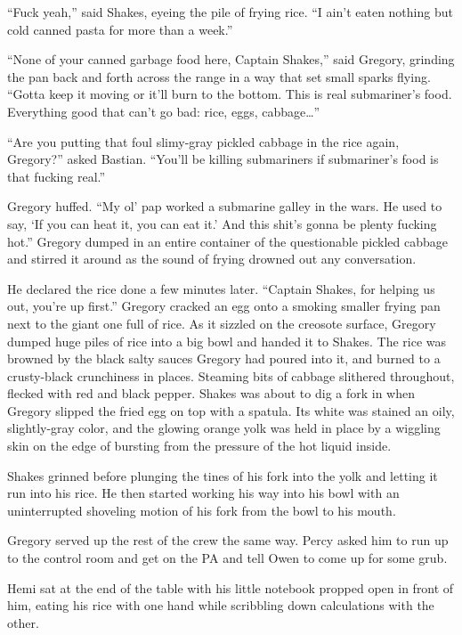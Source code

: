 \documentclass[
]{scrbook}
\begin{document}
``Fuck yeah,'' said Shakes, eyeing the pile of frying rice. ``I ain't
eaten nothing but cold canned pasta for more than a week.''

``None of your canned garbage food here, Captain Shakes,'' said Gregory,
grinding the pan back and forth across the range in a way that set small
sparks flying. ``Gotta keep it moving or it'll burn to the bottom. This
is real submariner's food. Everything good that can't go bad: rice,
eggs, cabbage\ldots{}''

``Are you putting that foul slimy-gray pickled cabbage in the rice
again, Gregory?'' asked Bastian. ``You'll be killing submariners if
submariner's food is that fucking real.''

Gregory huffed. ``My ol' pap worked a submarine galley in the wars. He
used to say, `If you can heat it, you can eat it.' And this shit's gonna
be plenty fucking hot.'' Gregory dumped in an entire container of the
questionable pickled cabbage and stirred it around as the sound of
frying drowned out any conversation.

He declared the rice done a few minutes later. ``Captain Shakes, for
helping us out, you're up first.'' Gregory cracked an egg onto a smoking
smaller frying pan next to the giant one full of rice. As it sizzled on
the creosote surface, Gregory dumped huge piles of rice into a big bowl
and handed it to Shakes. The rice was browned by the black salty sauces
Gregory had poured into it, and burned to a crusty-black crunchiness in
places. Steaming bits of cabbage slithered throughout, flecked with red
and black pepper. Shakes was about to dig a fork in when Gregory slipped
the fried egg on top with a spatula. Its white was stained an oily,
slightly-gray color, and the glowing orange yolk was held in place by a
wiggling skin on the edge of bursting from the pressure of the hot
liquid inside.

Shakes grinned before plunging the tines of his fork into the yolk and
letting it run into his rice. He then started working his way into his
bowl with an uninterrupted shoveling motion of his fork from the bowl to
his mouth.

Gregory served up the rest of the crew the same way. Percy asked him to
run up to the control room and get on the PA and tell Owen to come up
for some grub.

Hemi sat at the end of the table with his little notebook propped open
in front of him, eating his rice with one hand while scribbling down
calculations with the other.
\end{document}
